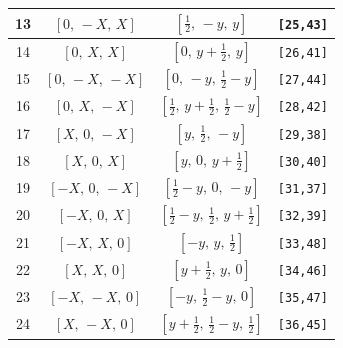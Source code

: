 \documentclass[fleqn,8pt]{jsarticle}
\begin{document}
\begin{longtable}{cccc}
13 & $\left[ 0,\, - X,\, X \right]$ & $\left[ \frac{1}{2},\, - y,\, y \right]$ & {\tt [25,43]} \\ \hline
14 & $\left[ 0,\, X,\, X \right]$ & $\left[ 0,\, y + \frac{1}{2},\, y \right]$ & {\tt [26,41]} \\ \hline
15 & $\left[ 0,\, - X,\, - X \right]$ & $\left[ 0,\, - y,\, \frac{1}{2} - y \right]$ & {\tt [27,44]} \\ \hline
16 & $\left[ 0,\, X,\, - X \right]$ & $\left[ \frac{1}{2},\, y + \frac{1}{2},\, \frac{1}{2} - y \right]$ & {\tt [28,42]} \\ \hline
17 & $\left[ X,\, 0,\, - X \right]$ & $\left[ y,\, \frac{1}{2},\, - y \right]$ & {\tt [29,38]} \\ \hline
18 & $\left[ X,\, 0,\, X \right]$ & $\left[ y,\, 0,\, y + \frac{1}{2} \right]$ & {\tt [30,40]} \\ \hline
19 & $\left[ - X,\, 0,\, - X \right]$ & $\left[ \frac{1}{2} - y,\, 0,\, - y \right]$ & {\tt [31,37]} \\ \hline
20 & $\left[ - X,\, 0,\, X \right]$ & $\left[ \frac{1}{2} - y,\, \frac{1}{2},\, y + \frac{1}{2} \right]$ & {\tt [32,39]} \\ \hline
21 & $\left[ - X,\, X,\, 0 \right]$ & $\left[ - y,\, y,\, \frac{1}{2} \right]$ & {\tt [33,48]} \\ \hline
22 & $\left[ X,\, X,\, 0 \right]$ & $\left[ y + \frac{1}{2},\, y,\, 0 \right]$ & {\tt [34,46]} \\ \hline
23 & $\left[ - X,\, - X,\, 0 \right]$ & $\left[ - y,\, \frac{1}{2} - y,\, 0 \right]$ & {\tt [35,47]} \\ \hline
24 & $\left[ X,\, - X,\, 0 \right]$ & $\left[ y + \frac{1}{2},\, \frac{1}{2} - y,\, \frac{1}{2} \right]$ & {\tt [36,45]} \\
\end{longtable}
\renewcommand{\arraystretch}{1.2}
\end{document}
